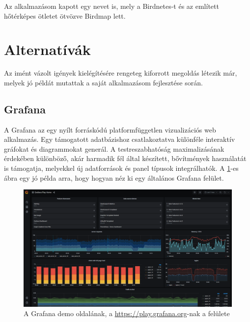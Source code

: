 Az alkalmazásom kapott egy nevet is, mely a Birdnetes-t és az említett hőtérképes ötletet ötvözve Birdmap lett.
\section{Alternatívák}
Az imént vázolt igények kielégítésére rengeteg kiforrott megoldás létezik már, melyek jó példát mutattak a saját alkalmazásom fejlesztése során.

\subsection{Grafana}
A Grafana\cite{grafana} az egy nyílt forráskódú platformfüggetlen vizualizációs web alkalmazás.
Egy támogatott adatbázishoz csatlakoztatva különféle interaktív gráfokat és diagrammokat generál.
A testreszabhatóság maximalizásának érdekében különböző, akár harmadik fél által készített, bővítmények használatát is támogatja, 
melyekkel új adatforrások és panel típusok integrálhatók. 
A \ref{fig:grafana}-es ábra egy jó példa arra, hogy hogyan néz ki egy általános Grafana felület.

\begin{figure}[!ht]
    \centering
    \includegraphics[width=150mm, keepaspectratio]{figures/grafana.png}
    \caption{A Grafana demo oldalának, a \url{https://play.grafana.org}-nak a felülete}
    \label{fig:grafana}
\end{figure}
    
